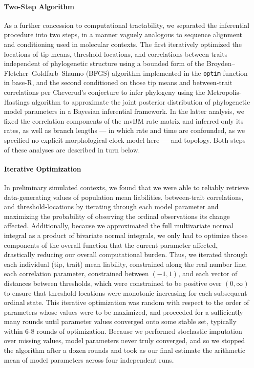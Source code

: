 \documentclass[12pt, twocolumn, twoside]{article}
\begin{document}
\paragraph{Two-Step Algorithm}

As a further concession to computational tractability, we separated the inferential procedure into two steps, in a manner vaguely analogous to sequence alignment and conditioning used in molecular contexts. The first iteratively optimized the locations of tip means, threshold locations, and correlations between traits independent of phylogenetic structure using a bounded form of the Broyden–Fletcher–Goldfarb–Shanno (BFGS) algorithm implemented in the \texttt{optim} function in base-R, and the second conditioned on those tip means and between-trait correlations per Cheverud's conjecture to infer phylogeny using the Metropolis-Hastings algorithm to approximate the joint posterior distribution of phylogenetic model parameters in a Bayesian inferential framework. In the latter analysis, we fixed the correlation components of the mvBM rate matrix and inferred only its rates, as well as branch lengths --- in which rate and time are confounded, as we specified no explicit morphological clock model here --- and topology. Both steps of these analyses are described in turn below.

\paragraph{Iterative Optimization}

In preliminary simulated contexts, we found that we were able to reliably retrieve data-generating values of population mean liabilities, between-trait correlations, and threshold-locations by iterating through each model parameter and maximizing the probability of observing the ordinal observations its change affected. Additionally, because we approximated the full multivariate normal integral as a product of bivariate normal integrals, we only had to optimize those components of the overall function that the current parameter affected, drastically reducing our overall computational burden. Thus, we iterated through each individual (tip, trait) mean liability, constrained along the real number line; each correlation parameter, constrained between $(-1,1)$, and each vector of distances between thresholds, which were constrained to be positive over $(0, \infty)$ to ensure that threshold locations were monotonic increasing for each subsequent ordinal state. This iterative optimization was random with respect to the order of parameters whose values were to be maximized, and proceeded for a sufficiently many rounds until parameter values converged onto some stable set, typically within 6-8 rounds of optimization. Because we performed stochastic imputation over missing values, model parameters never truly converged, and so we stopped the algorithm after a dozen rounds and took as our final estimate the arithmetic mean of model parameters across four independent runs. 
\end{document}
